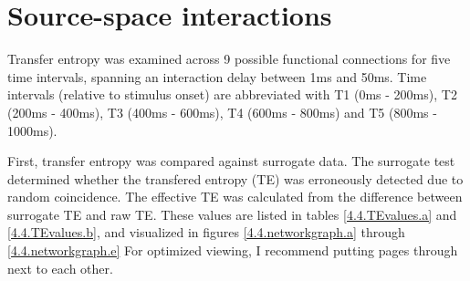 \section{Source-space interactions}

Transfer entropy was examined across 9 possible functional connections for five time intervals, spanning an interaction delay between 1ms and 50ms.
Time intervals (relative to stimulus onset) are abbreviated with T1 (0ms - 200ms), T2 (200ms - 400ms), T3 (400ms - 600ms), T4 (600ms - 800ms) and T5 (800ms - 1000ms).

First, transfer entropy was compared against surrogate data.
The surrogate test determined whether the transfered entropy (TE) was erroneously detected due to random coincidence.
The effective TE was calculated from the difference between surrogate TE and raw TE.
These values are listed in tables \ref{4.4.TEvalues.a} and \ref{4.4.TEvalues.b}, and visualized in figures \ref{4.4.networkgraph.a} through \ref{4.4.networkgraph.e} For optimized viewing, I recommend putting pages \pageref{4.4.networkgraph.a} through \pageref{4.4.networkgraph.e} next to each other.


